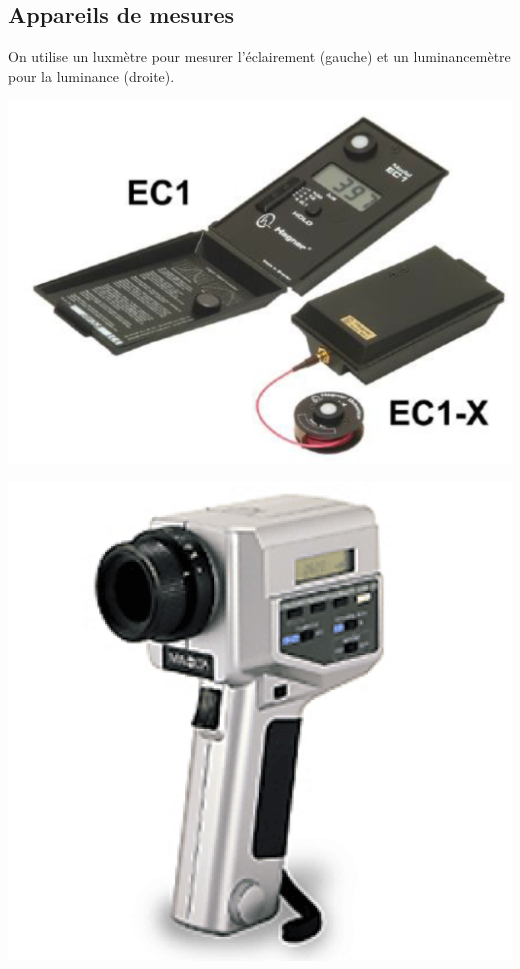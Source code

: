 \documentclass[11pt]{report}
\begin{document}
\newpage
\subsection{Appareils de mesures}
On utilise un luxmètre pour mesurer l'éclairement (gauche) et un  luminancemètre pour la luminance (droite).

\begin{minipage}{0.5\linewidth}
\centering
\includegraphics[width=0.3\linewidth]{luxm}
\end{minipage}
\begin{minipage}{0.5\linewidth}
\centering
\includegraphics[width=0.3\linewidth]{lumm}
\end{minipage}
\end{document}
